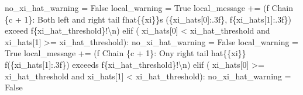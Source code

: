 \documentclass[
  letterpaper,
  DIV=11,
  numbers=noendperiod]{scrartcl}
\newenvironment{Shaded}{\begin{snugshade}}{\end{snugshade}}
\newcommand{\CharTok}[1]{\textcolor[rgb]{0.13,0.47,0.30}{#1}}
\newcommand{\ControlFlowTok}[1]{\textcolor[rgb]{0.00,0.23,0.31}{#1}}
\newcommand{\DecValTok}[1]{\textcolor[rgb]{0.68,0.00,0.00}{#1}}
\newcommand{\KeywordTok}[1]{\textcolor[rgb]{0.00,0.23,0.31}{#1}}
\newcommand{\NormalTok}[1]{\textcolor[rgb]{0.00,0.23,0.31}{#1}}
\newcommand{\OperatorTok}[1]{\textcolor[rgb]{0.37,0.37,0.37}{#1}}
\newcommand{\SpecialCharTok}[1]{\textcolor[rgb]{0.37,0.37,0.37}{#1}}
\newcommand{\SpecialStringTok}[1]{\textcolor[rgb]{0.13,0.47,0.30}{#1}}
\newcommand{\VariableTok}[1]{\textcolor[rgb]{0.07,0.07,0.07}{#1}}
\begin{document}
\begin{Shaded}
\begin{Highlighting}[]
\NormalTok{        no\_xi\_hat\_warning }\OperatorTok{=} \VariableTok{False}
\NormalTok{        local\_warning }\OperatorTok{=} \VariableTok{True}
\NormalTok{        local\_message }\OperatorTok{+=}\NormalTok{ (}\SpecialStringTok{f\textquotesingle{}  Chain }\SpecialCharTok{\{}\NormalTok{c }\OperatorTok{+} \DecValTok{1}\SpecialCharTok{\}}\SpecialStringTok{: Both left and right tail \textquotesingle{}}
                          \SpecialStringTok{f\textquotesingle{}hat}\CharTok{\{\{}\SpecialStringTok{xi}\CharTok{\}\}}\SpecialStringTok{s (}\SpecialCharTok{\{}\NormalTok{xi\_hats[}\DecValTok{0}\NormalTok{]}\SpecialCharTok{:.3f\}}\SpecialStringTok{, \textquotesingle{}}
                          \SpecialStringTok{f\textquotesingle{}}\SpecialCharTok{\{}\NormalTok{xi\_hats[}\DecValTok{1}\NormalTok{]}\SpecialCharTok{:.3f\}}\SpecialStringTok{) exceed \textquotesingle{}}
                          \SpecialStringTok{f\textquotesingle{}}\SpecialCharTok{\{}\NormalTok{xi\_hat\_threshold}\SpecialCharTok{\}}\SpecialStringTok{!}\CharTok{\textbackslash{}n}\SpecialStringTok{\textquotesingle{}}\NormalTok{)}
      \ControlFlowTok{elif}\NormalTok{ (    xi\_hats[}\DecValTok{0}\NormalTok{] }\OperatorTok{\textless{}}\NormalTok{ xi\_hat\_threshold }
            \KeywordTok{and}\NormalTok{ xi\_hats[}\DecValTok{1}\NormalTok{] }\OperatorTok{\textgreater{}=}\NormalTok{ xi\_hat\_threshold):}
\NormalTok{        no\_xi\_hat\_warning }\OperatorTok{=} \VariableTok{False}
\NormalTok{        local\_warning }\OperatorTok{=} \VariableTok{True}
\NormalTok{        local\_message }\OperatorTok{+=}\NormalTok{ (}\SpecialStringTok{f\textquotesingle{}  Chain }\SpecialCharTok{\{}\NormalTok{c }\OperatorTok{+} \DecValTok{1}\SpecialCharTok{\}}\SpecialStringTok{: Ony right tail hat}\CharTok{\{\{}\SpecialStringTok{xi}\CharTok{\}\}}\SpecialStringTok{ \textquotesingle{}}
                          \SpecialStringTok{f\textquotesingle{}(}\SpecialCharTok{\{}\NormalTok{xi\_hats[}\DecValTok{1}\NormalTok{]}\SpecialCharTok{:.3f\}}\SpecialStringTok{) exceeds \textquotesingle{}}
                          \SpecialStringTok{f\textquotesingle{}}\SpecialCharTok{\{}\NormalTok{xi\_hat\_threshold}\SpecialCharTok{\}}\SpecialStringTok{!}\CharTok{\textbackslash{}n}\SpecialStringTok{\textquotesingle{}}\NormalTok{)}
      \ControlFlowTok{elif}\NormalTok{ (    xi\_hats[}\DecValTok{0}\NormalTok{] }\OperatorTok{\textgreater{}=}\NormalTok{ xi\_hat\_threshold }
            \KeywordTok{and}\NormalTok{ xi\_hats[}\DecValTok{1}\NormalTok{] }\OperatorTok{\textless{}}\NormalTok{ xi\_hat\_threshold):}
\NormalTok{        no\_xi\_hat\_warning }\OperatorTok{=} \VariableTok{False}

\end{Highlighting}
\end{Shaded}
\end{document}
